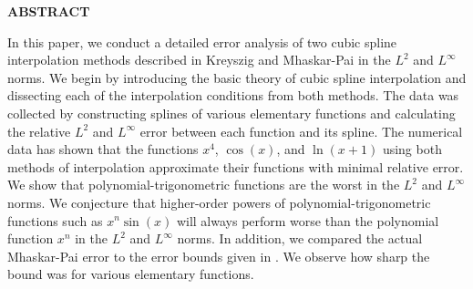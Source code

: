
\begin{center}

\end{center}

\begin{center}
{{\bf\fontsize{14pt}{14.5pt}\selectfont \uppercase{ABSTRACT}}}
\end{center}

\doublespacing
{}



\begin{center}
	\begin{doublespace}
	\end{doublespace}
\end{center}


In this paper, we conduct a detailed error analysis of two cubic spline interpolation methods described in Kreyszig and Mhaskar-Pai in the $L^2$ and $L^{\infty}$ norms. We begin by introducing the basic theory of cubic spline interpolation and dissecting each of the interpolation conditions from both methods. The data was collected by constructing splines of various elementary functions and calculating the relative $L^2$ and $L^{\infty}$ error between each function and its spline. The numerical data has shown that the functions $x^4$, $\cos(x)$, and $\ln(x+1)$ using both methods of interpolation approximate their functions with minimal relative error. We show that polynomial-trigonometric functions are the worst in the $L^2$ and $L^{\infty}$ norms. We conjecture that higher-order powers of polynomial-trigonometric functions such as $x^n\sin(x)$ will always perform worse than the polynomial function $x^{n}$ in the $L^2$ and $L^{\infty}$ norms. In addition, we compared the actual Mhaskar-Pai error to the error bounds given in \cite[pg.~269]{key5}. We observe how sharp the bound was for various elementary functions.

